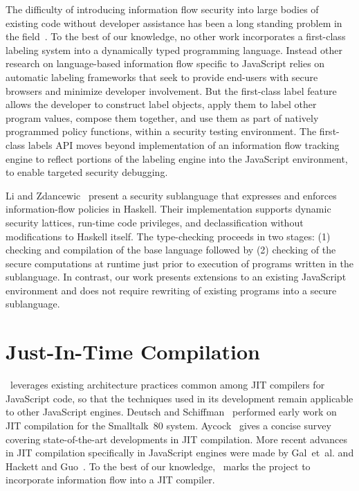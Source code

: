 The difficulty of introducing information flow security into large bodies of existing code without developer assistance has been a long standing problem in the field~\cite{sabelfeld.myers+03}.
To the best of our knowledge, no other work incorporates a first-class labeling system into a dynamically typed programming language.
Instead other research on language-based information flow specific to JavaScript relies on automatic labeling frameworks that seek to provide end-users with secure browsers and minimize developer involvement.
But the first-class label feature allows the developer to construct label objects, apply them to label other program values, compose them together, and use them as part of natively programmed policy functions, within a security testing environment.
The first-class labels API moves beyond implementation of an information flow tracking engine to reflect portions of the labeling engine into the JavaScript environment, to enable targeted security debugging.

Li and Zdancewic~\cite{li.zdancewic+06} present a security sublanguage that expresses and enforces information-flow policies in Haskell.
Their implementation supports dynamic security lattices, run-time code privileges, and declassification without modifications to Haskell itself.
The type-checking proceeds in two stages: (1) checking and compilation of the base language followed by (2) checking of the secure computations at runtime just prior to execution of programs written in the sublanguage.
In contrast, our work presents extensions to an existing JavaScript environment and does not require rewriting of existing programs into a secure sublanguage.

\section{Just-In-Time Compilation}

\JitFlow\ leverages existing architecture practices common among JIT compilers for JavaScript code, so that the techniques used in its development remain applicable to other JavaScript engines.
Deutsch and Schiffman~\cite{deutsch.schiffman+84} performed early work on JIT compilation for the Smalltalk~80 system.
Aycock~\cite{aycock+03} gives a concise survey covering state-of-the-art developments in JIT compilation.
More recent advances in JIT compilation specifically in JavaScript engines were made by Gal~et~al.\cite{gal.etal+09} and Hackett and Guo~\cite{hackett.guo+12}.
To the best of our knowledge, \JitFlow\ marks the project to incorporate information flow into a JIT compiler.

